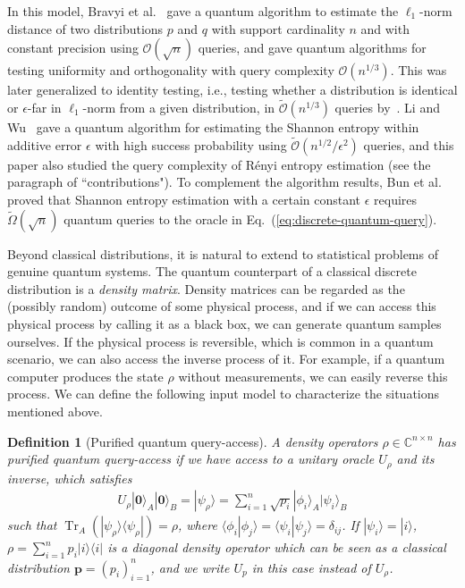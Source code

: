\documentclass[journal]{IEEEtran}
\newtheorem{definition}{Definition}
\newcommand{\eq}[1]{Eq.~(\ref{eq:#1})}
\def\Tr{\operatorname{Tr}}\def\atanh{\operatorname{atanh}}\def\:{\hbox{\bf:}}
\begin{document}
In this model, Bravyi et al.~\cite{bravyi2011quantum} gave a quantum algorithm to estimate the $\ell_{1}$-norm distance of two distributions $p$ and $q$ with support cardinality $n$ and with constant precision using $\mathcal{O}(\sqrt{n})$ queries, and gave quantum algorithms for testing uniformity and orthogonality with query complexity $\mathcal{O}(n^{1/3})$. This was later generalized to identity testing, i.e., testing whether a distribution is identical or $\epsilon$-far in $\ell_{1}$-norm from a given distribution, in $\widetilde{\mathcal{O}}(n^{1/3})$ queries by~\cite{chakraborty2010testing}. Li and Wu~\cite{li2019entropy} gave a quantum algorithm for estimating the Shannon entropy within additive error $\epsilon$ with high success probability using $\widetilde{\mathcal{O}}(n^{1/2}/\epsilon^{2})$ queries, and this paper also studied the query complexity of R{\'e}nyi entropy estimation (see the paragraph of ``contributions"). To complement the algorithm results, Bun et al.~\cite{bun2018polynomial} proved that Shannon entropy estimation with a certain constant $\epsilon$ requires $\widetilde{\Omega}(\sqrt{n})$ quantum queries to the oracle in \eq{discrete-quantum-query}.

Beyond classical distributions, it is natural to extend to statistical problems of genuine quantum systems. The quantum counterpart of a classical discrete distribution is a \emph{density matrix}. Density matrices can be regarded as the (possibly random) outcome of some physical process, and if we can access this physical process by calling it as a black box, we can generate quantum samples ourselves. If the physical process is reversible, which is common in a quantum scenario, we can also access the inverse process of it. For example, if a quantum computer produces the state $\rho$ without measurements, we can easily reverse this process. We can define the following input model to characterize the situations mentioned above.
\begin{definition}[Purified quantum query-access]
\label{defn:purified-query-access}
    A density operators $\rho\in \mathbb{C}^{n\times n}$ has purified quantum query-access if we have access to a unitary oracle $U_{\rho}$ and its inverse, which satisfies
    \begin{align}\label{eq:purified-query-access}
        U_{\rho}|\mathbf{0}\rangle_A|\mathbf{0}\rangle_B =|\psi_{\rho}\rangle= \sum_{i=1}^n\sqrt{p_i} |\phi_i\rangle_A|\psi_i\rangle_B
    \end{align}
    such that $\Tr_A(|\psi_{\rho}\rangle\langle \psi_{\rho}|) = \rho$, where $\langle\phi_i|\phi_j\rangle = \langle \psi_i|\psi_j\rangle = \delta_{ij}$. If $|\psi_i\rangle = |i\rangle$, $\rho = \sum_{i=1}^n p_i |i\rangle\langle i|$ is a diagonal density operator which can be seen as a classical distribution $\mathbf{p} = (p_i)_{i=1}^n$, and we write $U_p$ in this case instead of $U_\rho$.
\end{definition} 
\end{document}
